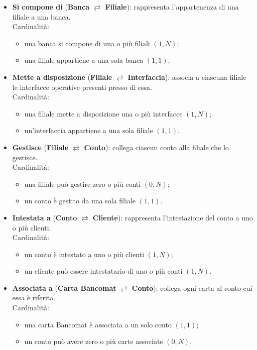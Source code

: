 \begin{itemize}
  \item \textbf{Si compone di} (\textbf{Banca} $\rightleftarrows$ \textbf{Filiale}): rappresenta l'appartenenza di una filiale a una banca.\\
  Cardinalità:
  \begin{itemize}
    \item una banca si compone di una o più filiali \((1,N)\);
    \item una filiale appartiene a una sola banca \((1,1)\).
  \end{itemize}

  \item \textbf{Mette a disposizione} (\textbf{Filiale} $\rightleftarrows$ \textbf{Interfaccia}): associa a ciascuna filiale le interfacce operative presenti presso di essa.\\
  Cardinalità:
  \begin{itemize}
    \item una filiale mette a disposizione una o più interfacce \((1,N)\);
    \item un'interfaccia appartiene a una sola filiale \((1,1)\).
  \end{itemize}

  \item \textbf{Gestisce} (\textbf{Filiale} $\rightleftarrows$ \textbf{Conto}): collega ciascun conto alla filiale che lo gestisce.\\
  Cardinalità:
  \begin{itemize}
    \item una filiale può gestire zero o più conti \((0,N)\);
    \item un conto è gestito da una sola filiale \((1,1)\).
  \end{itemize}

  \item \textbf{Intestata a} (\textbf{Conto} $\rightleftarrows$ \textbf{Cliente}): rappresenta l'intestazione del conto a uno o più clienti.\\
  Cardinalità:
  \begin{itemize}
    \item un conto è intestato a uno o più clienti \((1,N)\);
    \item un cliente può essere intestatario di uno o più conti \((1,N)\).
  \end{itemize}

  \item \textbf{Associata a} (\textbf{Carta Bancomat} $\rightleftarrows$ \textbf{Conto}): collega ogni carta al conto cui essa è riferita.\\
  Cardinalità:
  \begin{itemize}
    \item una carta Bancomat è associata a un solo conto \((1,1)\);
    \item un conto può avere zero o più carte associate \((0,N)\).
  \end{itemize}


\end{itemize}
